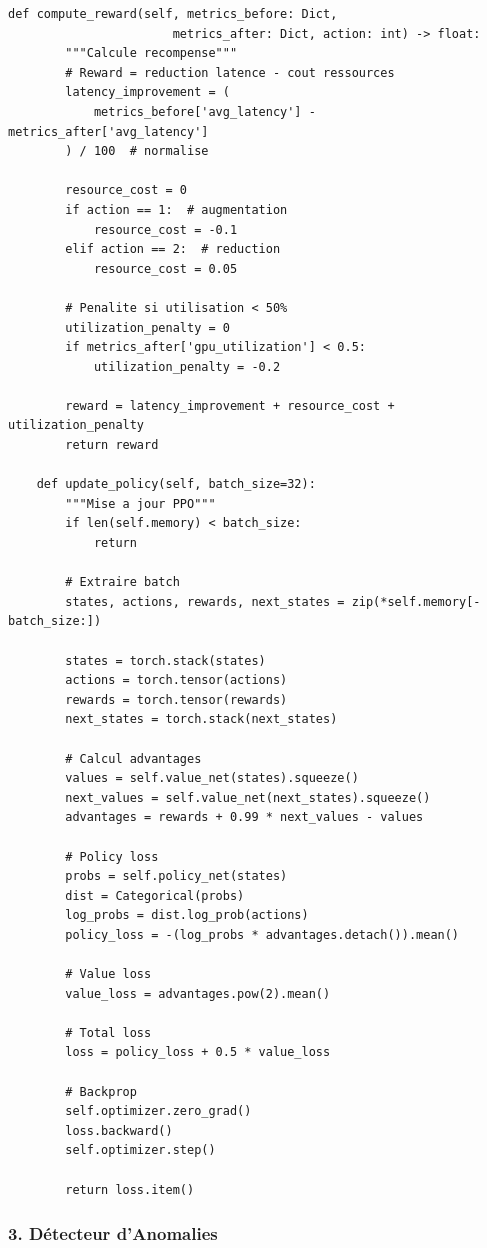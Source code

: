 \documentclass[12pt,a4paper]{article}
\begin{document}
\begin{lstlisting}[caption={Agent RL pour Resource Allocation}]
    def compute_reward(self, metrics_before: Dict, 
                       metrics_after: Dict, action: int) -> float:
        """Calcule recompense"""
        # Reward = reduction latence - cout ressources
        latency_improvement = (
            metrics_before['avg_latency'] - metrics_after['avg_latency']
        ) / 100  # normalise
        
        resource_cost = 0
        if action == 1:  # augmentation
            resource_cost = -0.1
        elif action == 2:  # reduction
            resource_cost = 0.05
            
        # Penalite si utilisation < 50%
        utilization_penalty = 0
        if metrics_after['gpu_utilization'] < 0.5:
            utilization_penalty = -0.2
            
        reward = latency_improvement + resource_cost + utilization_penalty
        return reward
        
    def update_policy(self, batch_size=32):
        """Mise a jour PPO"""
        if len(self.memory) < batch_size:
            return
            
        # Extraire batch
        states, actions, rewards, next_states = zip(*self.memory[-batch_size:])
        
        states = torch.stack(states)
        actions = torch.tensor(actions)
        rewards = torch.tensor(rewards)
        next_states = torch.stack(next_states)
        
        # Calcul advantages
        values = self.value_net(states).squeeze()
        next_values = self.value_net(next_states).squeeze()
        advantages = rewards + 0.99 * next_values - values
        
        # Policy loss
        probs = self.policy_net(states)
        dist = Categorical(probs)
        log_probs = dist.log_prob(actions)
        policy_loss = -(log_probs * advantages.detach()).mean()
        
        # Value loss
        value_loss = advantages.pow(2).mean()
        
        # Total loss
        loss = policy_loss + 0.5 * value_loss
        
        # Backprop
        self.optimizer.zero_grad()
        loss.backward()
        self.optimizer.step()
        
        return loss.item()
\end{lstlisting}

\subsubsection{3. Détecteur d'Anomalies}
\end{document}
